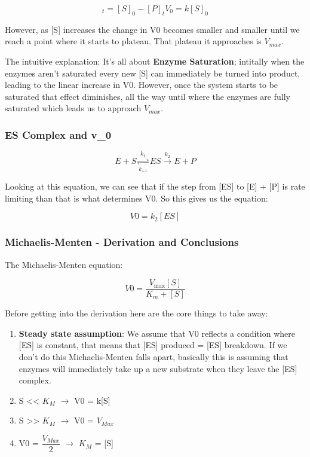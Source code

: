 \documentclass[../main.tex]{subfiles}
\begin{document}
\begin{equation}
	[S]_t = [S]_0 - [P]_t
	V_0 = k [S]_0
\end{equation}

However, as [S] increases the change in V0 becomes smaller and smaller until we reach a point where it starts to plateau. That plateau it approaches is $V_{max}$.

The intuitive explanation: It's all about \textbf{\gls{Enzyme Saturation}}; intitally when the enzymes aren't saturated every new [S] can immediately be turned into product, leading to the linear increase in V0. However, once the system starts to be saturated that effect diminishes, all the way until where the enzymes are fully saturated which leads us to approach $V_{max}$.

\subsubsection{ES Complex and \gls{v_0}}

\begin{equation}
	E + S \underset{k_{-1}}{\overset{k_1}{\rightleftharpoons}} ES \overset{k_2}{\rightarrow} E + P
\end{equation}


Looking at this equation, we can see that if the step from [ES] to [E] + [P] is rate limiting than that is what determines V0. So this gives us the equation:

\begin{equation}
	V0 = k_{2}[ES]
\end{equation}

\subsubsection{\gls{Michaelis-Menten} - Derivation and Conclusions}

The Michaelis-Menten equation:

\begin{equation*}
V0 = \frac{V_{\max} [S]}{K_m + [S]}
\end{equation*}


Before getting into the derivation here are the core things to take away:

\begin{enumerate}
	\item \textbf{Steady state assumption}: We assume that V0 reflects a condition where [ES] is constant, that means that [ES] produced = [ES] breakdown. If we don't do this Michaelis-Menten falls apart, basically this is assuming that enzymes will immediately take up a new substrate when they leave the [ES] complex.
	\item S << $K_{M}$ $\rightarrow$ V0 = k[S]
	\item S >> $K_{M}$ $\rightarrow$ V0 = $V_{Max}$
	\item V0 = $\dfrac{V_{Max}}{2}$ $\rightarrow$ $K_{M}$ = [S]
\end{enumerate}
\end{document}
